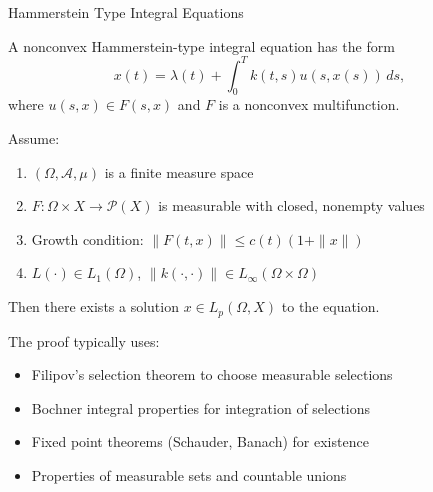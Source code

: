 \documentclass[aspectratio=169,10pt]{beamer}
\begin{document}
\begin{frame}[allowframebreaks]{Hammerstein Type Integral Equations}
\begin{definition}
A nonconvex Hammerstein-type integral equation has the form
$$x(t) = \lambda(t) + \int_0^T k(t, s) u(s, x(s)) \, ds,$$
where $u(s, x) \in F(s, x)$ and $F$ is a nonconvex multifunction.
\end{definition}

\vspace{0.3cm}

\begin{theorem}
Assume:
\begin{enumerate}
    \item $(\Omega, \mathcal{A}, \mu)$ is a finite measure space
    \item $F: \Omega \times X \to \mathcal{P}(X)$ is measurable with closed, nonempty values
    \item Growth condition: $\|F(t, x)\| \le c(t)(1 + \|x\|)$
    \item $L(\cdot) \in L_1(\Omega)$, $\|k(\cdot, \cdot)\| \in L_\infty(\Omega \times \Omega)$
\end{enumerate}

Then there exists a solution $x \in L_p(\Omega, X)$ to the equation.
\end{theorem}

\framebreak

\begin{remark}
The proof typically uses:
\begin{itemize}
    \item Filipov's selection theorem to choose measurable selections
    \item Bochner integral properties for integration of selections
    \item Fixed point theorems (Schauder, Banach) for existence
    \item Properties of measurable sets and countable unions
\end{itemize}
\end{remark}
\end{frame}
\end{document}
